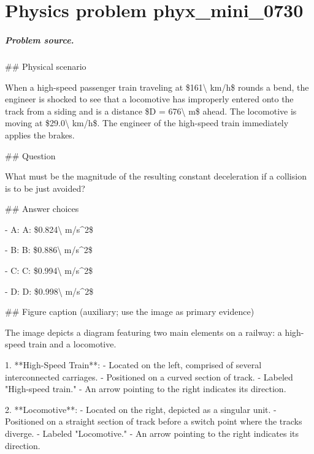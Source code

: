 
\chapter{Physics problem phyx\_mini\_0730}
\label{ch:PhyXMiniProblems_problem_phyx_mini_0730}

\paragraph{Problem source.}
\#\# Physical scenario

When a high-speed passenger train traveling at \$161\textbackslash{} km/h\$ rounds a bend, the engineer is shocked to see that a locomotive has improperly entered onto the track from a siding and is a distance \$D = 676\textbackslash{} m\$ ahead. The locomotive is moving at \$29.0\textbackslash{} km/h\$. The engineer of the high-speed train immediately applies the brakes.

\#\# Question

What must be the magnitude of the resulting constant deceleration if a collision is to be just avoided?

\#\# Answer choices

- A: A: \$0.824\textbackslash{} m/s\textasciicircum{}2\$

- B: B: \$0.886\textbackslash{} m/s\textasciicircum{}2\$

- C: C: \$0.994\textbackslash{} m/s\textasciicircum{}2\$

- D: D: \$0.998\textbackslash{} m/s\textasciicircum{}2\$

\#\# Figure caption (auxiliary; use the image as primary evidence)

The image depicts a diagram featuring two main elements on a railway: a high-speed train and a locomotive. 

1. **High-Speed Train**: 
   - Located on the left, comprised of several interconnected carriages.
   - Positioned on a curved section of track.
   - Labeled "High-speed train."
   - An arrow pointing to the right indicates its direction.

2. **Locomotive**:
   - Located on the right, depicted as a singular unit.
   - Positioned on a straight section of track before a switch point where the tracks diverge.
   - Labeled "Locomotive."
   - An arrow pointing to the right indicates its direction.


